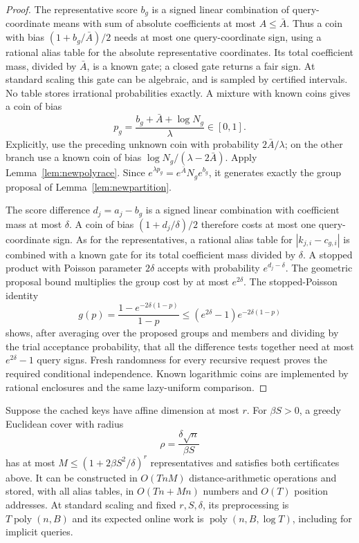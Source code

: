 \begin{proof}
The representative score $b_g$ is a signed linear combination of
query-coordinate means with sum of absolute coefficients at most
$A\le\bar A$. Thus a coin with bias $(1+b_g/\bar A)/2$ needs at
most one query-coordinate sign, using a rational alias table for the absolute representative
coordinates.  Its total coefficient mass, divided by $\bar A$,
is a known gate; a closed gate returns a fair sign.  At standard
scaling this gate can be algebraic, and is sampled by certified
intervals.  No table stores irrational probabilities exactly. A mixture with known coins gives a coin of bias
\[
 p_g=\frac{b_g+\bar A+\log N_g}{\lambda}\in[0,1].
\]
Explicitly, use the preceding unknown coin with probability
$2\bar A/\lambda$; on the other branch use a known coin of bias
$\log N_g/(\lambda-2\bar A)$. Apply
Lemma~\ref{lem:newpolyrace}. Since
$e^{\lambda p_g}=e^{\bar A}N_ge^{b_g}$, it generates exactly the
group proposal of Lemma~\ref{lem:newpartition}.

The score difference $d_j=a_j-b_g$ is a signed linear combination
with coefficient mass at most $\delta$. A coin of bias
$(1+d_j/\delta)/2$ therefore costs at most one query-coordinate
sign.  As for the representatives, a rational alias table for
$|k_{j,i}-c_{g,i}|$ is combined with a known gate for its total
coefficient mass divided by $\delta$. A stopped product with Poisson parameter $2\delta$ accepts
with probability $e^{d_j-\delta}$.
The geometric proposal bound multiplies the group cost by at most
$e^{2\delta}$. The stopped-Poisson identity
\[
 g(p)=\frac{1-e^{-2\delta(1-p)}}{1-p}
 \le(e^{2\delta}-1)e^{-2\delta(1-p)}
\]
shows, after averaging over the proposed groups and members and
dividing by the trial acceptance probability, that all the
difference tests together need at most $e^{2\delta}-1$ query signs.
Fresh randomness for every recursive request proves the required
conditional independence. Known logarithmic coins are implemented
by rational enclosures and the same lazy-uniform comparison.
\end{proof}

\begin{corollary}
\label{cor:newrankcover}
Suppose the cached keys have affine dimension at most $r$. For
$\beta S>0$, a greedy Euclidean cover with radius
\[
 \rho=\frac{\delta\sqrt n}{\beta S}
\]
has at most $M\le(1+2\beta S^2/\delta)^r$ representatives and
satisfies both certificates above. It can be constructed in
$O(TnM)$ distance-arithmetic operations and stored, with all alias
tables, in $O(Tn+Mn)$ numbers and $O(T)$ position addresses.
At standard scaling and fixed $r,S,\delta$, its preprocessing is
$T\operatorname{poly}(n,B)$ and its expected online work is
$\operatorname{poly}(n,B,\log T)$, including for implicit queries.
\end{corollary}
